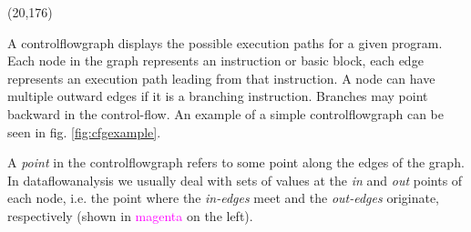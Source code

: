 \documentclass[bsc,twoside,singlespacing,parskip,logo,notimes,normalheadings]{infthesis}
\newcommand{\cfgpoint}[1][]{%
  \draw[magenta, fill=magenta!90] (#1) circle (0.5mm);
}
\begin{document}
        \begin{textblock}{80}(20,176)
            \captionsetup{width=8cm,justification=justified}
            \label{fig:cfgexample}
        \end{textblock}

        \hfill\begin{minipage}{\dimexpr\textwidth-6cm}

          A \gls{controlflowgraph} displays the possible execution
          paths for a given program. Each node in the graph represents
          an instruction or basic block, each edge represents an
          execution path leading from that instruction. A node can
          have multiple outward edges if it is a branching
          instruction. Branches may point backward in the
          control-flow. An example of a simple \gls{controlflowgraph}
          can be seen in fig. \ref{fig:cfgexample}.
          
          \vspace{0.26cm}

          A {\em point} in the \gls{controlflowgraph} refers to some
          point along the edges of the graph. In
          \gls{dataflowanalysis} we usually deal with sets of values
          at the {\em in} and {\em out} points of each node, i.e. the
          point where the {\em in-edges} meet and the {\em out-edges}
          originate, respectively (shown in
          \textcolor{magenta}{magenta} on the left).

        \end{minipage}
\end{document}
